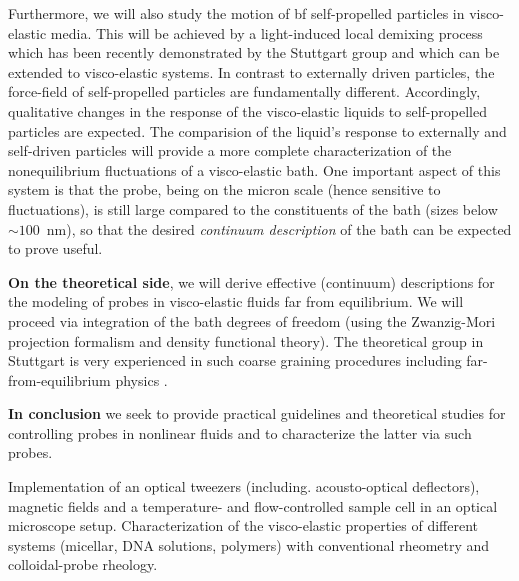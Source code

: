 \begin{workpackage}
\begin{wpdescription}
Furthermore, we will also study the motion of {bf self-propelled particles} in visco-elastic media. This will be achieved by a light-induced local demixing process which has been recently demonstrated by the Stuttgart group \cite{kuemmel2013, buttinoni2013, tenHagen2014} and which can be extended to visco-elastic systems. In contrast to externally driven particles, the force-field of self-propelled particles are fundamentally different. Accordingly, qualitative changes in the response of the visco-elastic liquids to self-propelled particles are expected. The comparision of the liquid's response to externally and self-driven particles will provide a more complete characterization of the
nonequilibrium fluctuations of a visco-elastic bath. One important aspect of this system is that the
probe, being on the micron scale (hence sensitive to fluctuations), is still large compared
to the constituents of the bath (sizes below $\sim 100$~nm), so that the desired {\it
  continuum description} of the bath can be expected to prove useful.

{\bf On the theoretical side}, we will derive effective (continuum) descriptions for the
modeling of probes in visco-elastic fluids far from equilibrium. We will proceed via
integration of the bath degrees of freedom (using the Zwanzig-Mori projection formalism and
density functional theory).
%
The theoretical group in Stuttgart is very experienced in such coarse graining procedures
\cite{Aerov14} including far-from-equilibrium physics \cite{Kruger11,Kruger09}.

{\bf In conclusion} we seek to provide practical guidelines and theoretical studies for controlling probes in nonlinear fluids and to characterize the latter via such probes.



\printbibliography[heading=proposal-bib,env=proposal-env]

\end{wpdescription}

\begin{tasklist}

\begin{task}[title=Experimental setup,id=brown-t1,PM=24,lead=USTUTT,wphases=0-24!0.5]
Implementation of an optical tweezers (including. acousto-optical deflectors), magnetic fields and a temperature- and flow-controlled sample cell in an optical microscope setup. Characterization of the visco-elastic properties of different systems (micellar, DNA solutions, polymers) with conventional rheometry and colloidal-probe rheology. 
\end{task}



\end{tasklist}
\end{workpackage}
